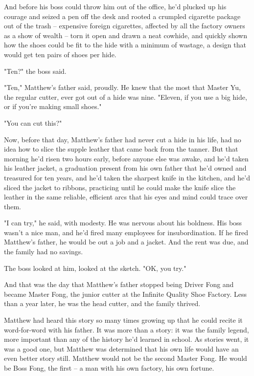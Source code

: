 And before his boss could throw him out of the office, he'd plucked
up his courage and seized a pen off the desk and rooted a crumpled
cigarette package out of the trash -- expensive foreign cigarettes,
affected by all the factory owners as a show of wealth -- torn it
open and drawn a neat cowhide, and quickly shown how the shoes
could be fit to the hide with a minimum of wastage, a design that
would get ten pairs of shoes per hide.

"Ten?" the boss said.

"Ten," Matthew's father said, proudly. He knew that the most that
Master Yu, the regular cutter, ever got out of a hide was nine.
"Eleven, if you use a big hide, or if you're making small shoes."

"You can cut this?"

Now, before that day, Matthew's father had never cut a hide in his
life, had no idea how to slice the supple leather that came back
from the tanner. But that morning he'd risen two hours early,
before anyone else was awake, and he'd taken his leather jacket, a
graduation present from his own father that he'd owned and
treasured for ten years, and he'd taken the sharpest knife in the
kitchen, and he'd sliced the jacket to ribbons, practicing until he
could make the knife slice the leather in the same reliable,
efficient arcs that his eyes and mind could trace over them.

"I can try," he said, with modesty. He was nervous about his
boldness. His boss wasn't a nice man, and he'd fired many employees
for insubordination. If he fired Matthew's father, he would be out
a job and a jacket. And the rent was due, and the family had no
savings.

The boss looked at him, looked at the sketch. "OK, you try."

And that was the day that Matthew's father stopped being Driver
Fong and became Master Fong, the junior cutter at the Infinite
Quality Shoe Factory. Less than a year later, he was the head
cutter, and the family thrived.

Matthew had heard this story so many times growing up that he could
recite it word-for-word with his father. It was more than a story:
it was the family legend, more important than any of the history
he'd learned in school. As stories went, it was a good one, but
Matthew was determined that his own life would have an even better
story still. Matthew would not be the second Master Fong. He would
be Boss Fong, the first -- a man with his own factory, his own
fortune.

